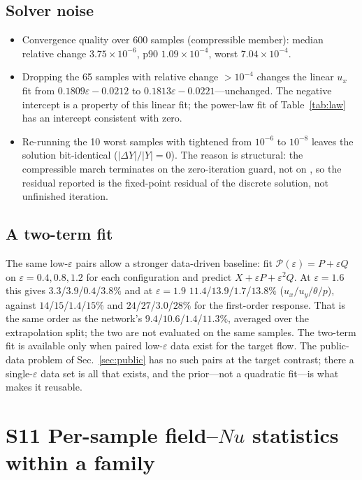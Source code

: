 \documentclass[preprint,11pt,a4paper,times]{elsarticle}
\begin{document}
\subsection*{Solver noise}



\begin{itemize}
\item Convergence quality over 600 samples (compressible member): median relative change
$3.75\times10^{-6}$, p90 $1.09\times10^{-4}$, worst $7.04\times10^{-4}$.
\item Dropping the 65 samples with relative change $>10^{-4}$ changes the linear $u_x$ fit from
$0.1809\varepsilon-0.0212$ to $0.1813\varepsilon-0.0221$---unchanged. The negative intercept is a
property of this linear fit; the power-law fit of Table~\ref{tab:law} has an intercept consistent
with zero.
\item Re-running the 10 worst samples with  tightened from $10^{-6}$ to
$10^{-8}$ leaves the solution bit-identical ($|\Delta Y|/|Y|=0$). The reason is
structural: the compressible march terminates on the zero-iteration guard, not on
, so the residual reported is the fixed-point residual of the discrete solution,
not unfinished iteration.
\end{itemize}

\subsection*{A two-term fit} The same low-$\varepsilon$ pairs allow a stronger
data-driven baseline: fit $\mathcal{P}(\varepsilon)=P+\varepsilon Q$ on $\varepsilon=0.4,0.8,1.2$ for each
configuration and predict $X+\varepsilon P+\varepsilon^2Q$. At $\varepsilon=1.6$ this gives
$3.3$/$3.9$/$0.4$/$3.8\%$ and at $\varepsilon=1.9$ $11.4$/$13.9$/$1.7$/$13.8\%$
($u_x/u_y/\theta/p$), against $14$/$15$/$1.4$/$15\%$ and $24$/$27$/$3.0$/$28\%$ for the
first-order response. That is the same order as the network's $9.4$/$10.6$/$1.4$/$11.3\%$,
averaged over the extrapolation split; the two are not evaluated on the same samples. The two-term fit is available only when paired
low-$\varepsilon$ data exist for the target flow. The public-data problem of Sec.~\ref{sec:public}
has no such pairs at the target contrast; there a single-$\varepsilon$ data set is all that exists,
and the prior---not a quadratic fit---is what makes it reusable.

\section*{S11 Per-sample field--$Nu$ statistics within a family}
\end{document}
